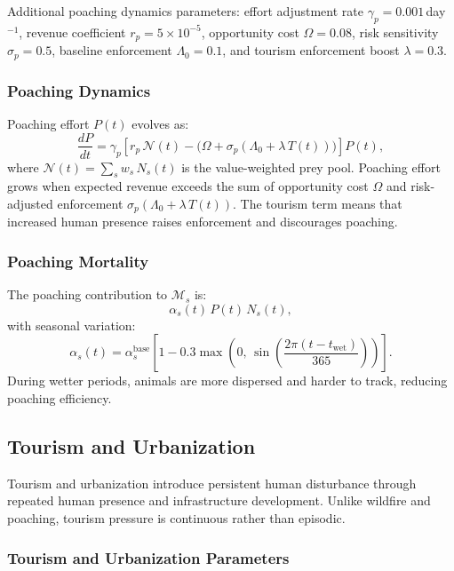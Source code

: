 Additional poaching dynamics parameters: effort adjustment rate $\gamma_p = 0.001$\,day$^{-1}$, revenue coefficient $r_p = 5 \times 10^{-5}$, opportunity cost $\Omega = 0.08$, risk sensitivity $\sigma_p = 0.5$, baseline enforcement $\Lambda_0 = 0.1$, and tourism enforcement boost $\lambda = 0.3$.

\subsubsection{Poaching Dynamics}

Poaching effort $P(t)$ evolves as:
\[
\frac{dP}{dt} = \gamma_p\left[r_p\,\mathcal{N}(t) - \bigl(\Omega + \sigma_p(\Lambda_0 + \lambda\, T(t))\bigr)\right]P(t),
\]
where $\mathcal{N}(t) = \sum_s w_s\, N_s(t)$ is the value-weighted prey pool. Poaching effort grows when expected revenue exceeds the sum of opportunity cost $\Omega$ and risk-adjusted enforcement $\sigma_p(\Lambda_0 + \lambda\, T(t))$. The tourism term means that increased human presence raises enforcement and discourages poaching.

\subsubsection{Poaching Mortality}

The poaching contribution to $\mathcal{M}_s$ is:
\[
\alpha_s(t)\,P(t)\,N_s(t),
\]
with seasonal variation:
\[
\alpha_s(t) = \alpha_s^{\text{base}}\left[1 - 0.3\max\!\left(0,\,\sin\!\left(\frac{2\pi(t - t_{\text{wet}})}{365}\right)\right)\right].
\]
During wetter periods, animals are more dispersed and harder to track, reducing poaching efficiency.

\subsection{Tourism and Urbanization}
\label{sec:tourism}

Tourism and urbanization introduce persistent human disturbance through repeated human presence and infrastructure development. Unlike wildfire and poaching, tourism pressure is continuous rather than episodic.

\subsubsection{Tourism and Urbanization Parameters}

